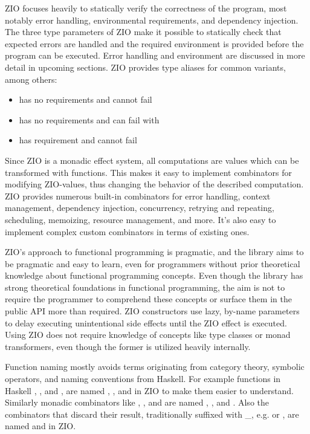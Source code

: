 ZIO focuses heavily to statically verify the correctness of the program, most notably error handling, environmental requirements, and dependency injection. The three type parameters of ZIO make it possible to statically check that expected errors are handled and the required environment is provided before the program can be executed. Error handling and environment are discussed in more detail in upcoming sections. ZIO provides type aliases for common variants, among others:
\begin{itemize}
    \item {} has no requirements and cannot fail
    \item {} has no requirements and can fail with 
    \item {} has requirement  and cannot fail
\end{itemize}

Since ZIO is a monadic effect system, all computations are values which can be transformed with functions. This makes it easy to implement combinators for modifying ZIO-values, thus changing the behavior of the described computation. ZIO provides numerous built-in combinators for error handling, context management, dependency injection, concurrency, retrying and repeating, scheduling, memoizing, resource management, and more. It's also easy to implement complex custom combinators in terms of existing ones.

ZIO's approach to functional programming is pragmatic, and the library aims to be pragmatic and easy to learn, even for programmers without prior theoretical knowledge about functional programming concepts. Even though the library has strong theoretical foundations in functional programming, the aim is not to require the programmer to comprehend these concepts or surface them in the public API more than required. ZIO constructors use lazy, by-name parameters to delay executing unintentional side effects until the ZIO effect is executed. Using ZIO does not require knowledge of concepts like type classes or monad transformers, even though the former is utilized heavily internally.

Function naming mostly avoids terms originating from category theory, symbolic operators, and naming conventions from Haskell. For example functions in Haskell , , and , are named , , and  in ZIO to make them easier to understand. Similarly monadic combinators like , , and  are named , , and . Also the combinators that discard their result, traditionally suffixed with \_, e.g.  or , are named  and  in ZIO.

